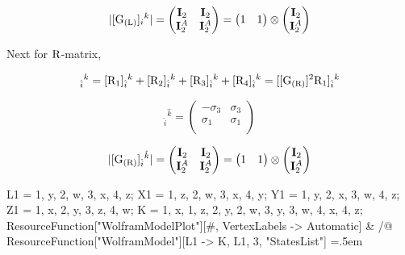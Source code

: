 \documentclass[12pt]{article}
\newenvironment{lcverbatim}
 {\SaveVerbatim{cverb}}
 {\endSaveVerbatim
  \flushleft\fboxrule=0pt\fboxsep=.5em
  \colorbox{cverbbg}{%
    \makebox[\dimexpr\linewidth-2\fboxsep][l]{\BUseVerbatim{cverb}}%
  }
  \endflushleft
}
\def\rR{{\rm R}}
\let\bm\relax
\newcommand{\bm}[1]{{\boldsymbol{#1}}}
\begin{document}
\begin{equation}
|[\bm{\rm G_{(L)}}]_{i}{}^{k}|=
\begin{pmatrix}
\mathbf{I}_2 & \mathbf{I}_2 \\
\mathbf{I}^A_2 & \mathbf{I}^A_2\\
\end{pmatrix}
=
\begin{pmatrix}
1 & 1\\
\end{pmatrix}
\otimes
\begin{pmatrix}
\mathbf{I}_2 \\
\mathbf{I}^A_2 \\
\end{pmatrix}
\end{equation}

Next for $\bm\rR$-matrix,

\begin{equation}
[{\bm{\rm R}}]_{\hat i}{}^{k}=[{\bm{\rm R}}_1]_{\hat i}{}^{k}+[{\bm{\rm R}}_2]_{\hat i}{}^{k}+[{\bm{\rm R}}_3]_{\hat i}{}^{k}+[{\bm{\rm R}}_4]_{\hat i}{}^{k}=[[{\bm{\rm G_{(R)}}}]^2{\bm{\rm R}}_1]_{\hat i}{}^{k}
\end{equation}

\begin{equation}
[{\bm{\rm G_{(R)}}}]_{\hat i}{}^{\hat k}=
\begin{pmatrix}
-\sigma_3 & \sigma_3 \\
\sigma_1 & \sigma_1 \\
\end{pmatrix}
\end{equation}

\begin{equation}
|[{\bm{\rm G_{(R)}}}]_{\hat i}{}^{\hat k}|=
\begin{pmatrix}
\mathbf{I}_2 & \mathbf{I}_2 \\
\mathbf{I}^A_2 & \mathbf{I}^A_2\\
\end{pmatrix}
=
\begin{pmatrix}
1 & 1\\
\end{pmatrix}
\otimes
\begin{pmatrix}
\mathbf{I}_2 \\
\mathbf{I}^A_2 \\
\end{pmatrix}
\end{equation}

\begin{lcverbatim}
L1 = {{1, y}, {2, w}, {3, x}, {4, z}};
X1 = {{1, z}, {2, w}, {3, x}, {4, y}};
Y1 = {{1, y}, {2, x}, {3, w}, {4, z}};
Z1 = {{1, x}, {2, y}, {3, z}, {4, w}};
K = {{1, x}, {1, z}, {2, y}, {2, w}, {3, y}, {3, w}, {4, x}, {4, z}};
ResourceFunction["WolframModelPlot"][#, VertexLabels -> Automatic] & /@
  ResourceFunction["WolframModel"][{L1 -> K}, L1, 3, "StatesList"]
\end{lcverbatim}
\end{document}

